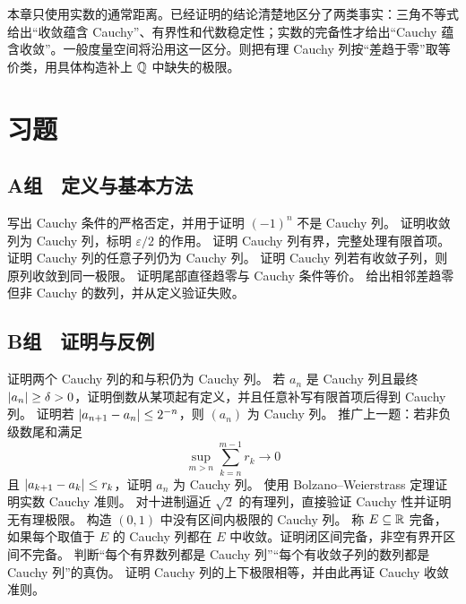 本章只使用实数的通常距离。已经证明的结论清楚地区分了两类事实：三角不等式给出“收敛蕴含 Cauchy”、有界性和代数稳定性；实数的完备性才给出“Cauchy 蕴含收敛”。一般度量空间将沿用这一区分。则把有理 Cauchy 列按“差趋于零”取等价类，用具体构造补上 \(\mathbb{Q}\) 中缺失的极限。

\section*{习题}

\subsection*{A组　定义与基本方法}
\begin{enumerate}[label=\textbf{\thechapter.\arabic*.}]
  写出 Cauchy 条件的严格否定，并用于证明 \((-1)^n\) 不是 Cauchy 列。
  证明收敛列为 Cauchy 列，标明 \(\varepsilon/2\) 的作用。
  证明 Cauchy 列有界，完整处理有限首项。
  证明 Cauchy 列的任意子列仍为 Cauchy 列。
  证明 Cauchy 列若有收敛子列，则原列收敛到同一极限。
  证明尾部直径趋零与 Cauchy 条件等价。
  给出相邻差趋零但非 Cauchy 的数列，并从定义验证失败。
\end{enumerate}

\subsection*{B组　证明与反例}
\begin{enumerate}[label=\textbf{\thechapter.\arabic*.},resume]
  证明两个 Cauchy 列的和与积仍为 Cauchy 列。
  若 \(a_n\) 是 Cauchy 列且最终
 \(\left|a_n\right|\ge\delta>0\)，证明倒数从某项起有定义，并且任意补写有限首项后得到 Cauchy 列。
  证明若 \(\left|a_{n+1}-a_n\right|\le2^{-n}\)，则 \((a_n)\) 为 Cauchy 列。
  推广上一题：若非负级数尾和满足
 \[
 \sup_{m>n}\sum_{k=n}^{m-1}r_k\to0
 \]
 且 \(\left|a_{k+1}-a_k\right|\le r_k\)，证明 \(a_n\) 为 Cauchy 列。
  使用 Bolzano--Weierstrass 定理证明实数 Cauchy 准则。
  对十进制逼近 \(\sqrt2\) 的有理列，直接验证 Cauchy 性并证明无有理极限。
  构造 \((0,1)\) 中没有区间内极限的 Cauchy 列。
  称 \(E\subseteq\mathbb{R}\) 完备，如果每个取值于 \(E\) 的 Cauchy 列都在 \(E\) 中收敛。证明闭区间完备，非空有界开区间不完备。
  判断“每个有界数列都是 Cauchy 列”“每个有收敛子列的数列都是 Cauchy 列”的真伪。
  证明 Cauchy 列的上下极限相等，并由此再证 Cauchy 收敛准则。
\end{enumerate}

